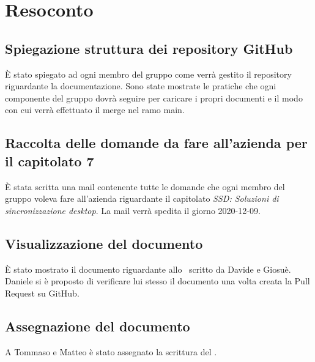 \newpage


\section{Resoconto}

\subsection{Spiegazione struttura dei repository GitHub}

È stato spiegato ad ogni membro del gruppo come verrà gestito il repository riguardante la documentazione. Sono state mostrate le pratiche che ogni componente del gruppo dovrà seguire per caricare i propri documenti e il modo con cui verrà effettuato il merge nel ramo main.

\subsection{Raccolta delle domande da fare all'azienda per il capitolato 7}

È stata scritta una mail contenente tutte le domande che ogni membro del gruppo voleva fare all'azienda riguardante il capitolato \textit{SSD: Soluzioni di sincronizzazione desktop}.
La mail verrà spedita il giorno 2020-12-09.

\subsection{Visualizzazione del documento \SdF{}}

È stato mostrato il documento riguardante allo \SdF\ scritto da Davide e Giosuè. Daniele si è proposto di verificare lui stesso il documento una volta creata la Pull Request su GitHub.

\subsection{Assegnazione del documento \PdP{}}

A Tommaso e Matteo è stato assegnato la scrittura del \PdP .

\newpage


